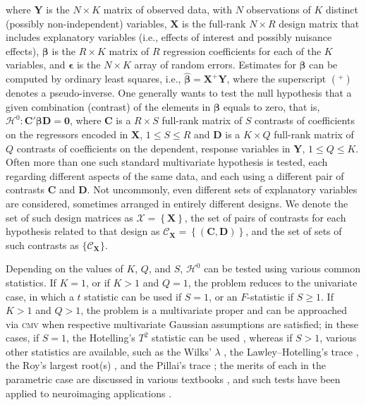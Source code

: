 \noindent
where $\mathbf{Y}$ is the $N \times K$ matrix of observed data, with $N$ observations of $K$ distinct (possibly non-independent) variables, $\mathbf{X}$ is the full-rank $N \times R$ design matrix that includes explanatory variables (i.e., effects of interest and possibly nuisance effects), $\boldsymbol{\beta}$ is the $R \times K$ matrix of $R$ regression coefficients for each of the $K$ variables, and $\boldsymbol{\epsilon}$ is the $N \times K$ array of random errors. Estimates for $\boldsymbol{\beta}$ can be computed by ordinary least squares, i.e., $\boldsymbol{\hat{\beta}} = \mathbf{X}^{+}\mathbf{Y}$, where the superscript $(^{+})$ denotes a pseudo-inverse. One generally wants to test the null hypothesis that a given combination (contrast) of the elements in $\boldsymbol{\beta}$ equals to zero, that is, $\mathcal{H}^{0} : \mathbf{C}'\boldsymbol{\beta}\mathbf{D} = \boldsymbol{0}$, where $\mathbf{C}$ is a $R \times S$ full-rank matrix of $S$ contrasts of coefficients on the regressors encoded in $\mathbf{X}$, $1 \leqslant S \leqslant R$ and $\mathbf{D}$ is a $K \times Q$ full-rank matrix of $Q$ contrasts of coefficients on the dependent, response variables in $\mathbf{Y}$, $1 \leqslant Q \leqslant K$. Often more than one such standard multivariate hypothesis is tested, each regarding different aspects of the same data, and each using a different pair of contrasts $\mathbf{C}$ and $\mathbf{D}$. Not uncommonly, even different sets of explanatory variables are considered, sometimes arranged in entirely different designs. We denote the set of such design matrices as $\mathcal{X} = \left\{\mathbf{X}\right\}$, the set of pairs of contrasts for each hypothesis related to that design as $\mathcal{C}_{\mathbf{X}}=\left\{\left(\mathbf{C},\mathbf{D}\right)\right\}$, and the set of sets of such contrasts as $\{\mathcal{C}_{\mathbf{X}}\}$.

Depending on the values of $K$, $Q$, and $S$, $\mathcal{H}^0$ can be tested using various common statistics. If $K=1$, or if $K>1$ and $Q=1$, the problem reduces to the univariate case, in which a $t$ statistic can be used if $S=1$, or an $F$-statistic if $S \geqslant 1$. If $K>1$ and $Q>1$, the problem is a multivariate proper and can be approached via \textsc{cmv} when respective multivariate Gaussian assumptions are satisfied; in these cases, if $S = 1$, the Hotelling's $T^2$ statistic can be used \citep{Hotelling1931}, whereas if $S>1$, various other statistics are available, such as the Wilks' $\lambda$ \citep{Wilks1932}, the Lawley--Hotelling's trace \citep{Lawley1938, Hotelling1951}, the Roy's largest root(s) \citep{Roy1953, Kuhfeld1986}, and the Pillai's trace \citep{Pillai1955}; the merits of each in the parametric case are discussed in various textbooks \citep[e.g.,][]{Christensen2001, Timm2002, Anderson2003, Johnson2007}, and such tests have been applied to neuroimaging applications \citep{Chen2014}.

